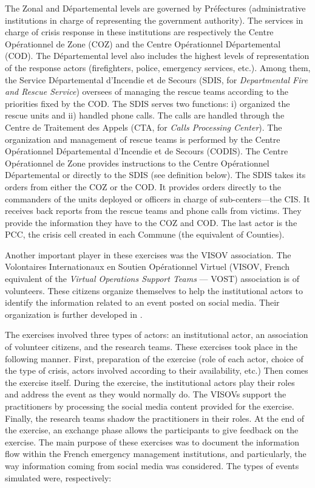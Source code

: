 The Zonal and Départemental levels are governed by Préfectures (administrative institutions in charge of representing the government authority).
The services in charge of crisis response in these institutions are respectively the Centre Opérationnel de Zone (COZ) and the Centre Opérationnel Départemental (COD).
The Départemental level also includes the highest levels of representation of the response actors (firefighters, police, emergency services, etc.).
Among them, the Service Départemental d'Incendie et de Secours (SDIS, for \textit{Departmental Fire and Rescue Service}) oversees of managing the rescue teams according to the priorities fixed by the COD.
The SDIS serves two functions: i) organized the rescue units and ii) handled phone calls.
The calls are handled through the Centre de Traitement des Appels (CTA, for \textit{Calls Processing Center}).
The organization and management of rescue teams is performed by the Centre Opérationnel Départemental d’Incendie et de Secours (CODIS).
The Centre Opérationnel de Zone provides instructions to the Centre Opérationnel Départemental or directly to the SDIS (see definition below).
The SDIS takes its orders from either the COZ or the COD.
It provides orders directly to the commanders of the units deployed or officers in charge of sub-centers—the CIS.
It receives back reports from the rescue teams and phone calls from victims.
They provide the information they have to the COZ and COD.
The last actor is the PCC, the crisis cell created in each Commune (the equivalent of Counties).

Another important player in these exercises was the VISOV association.
The Volontaires Internationaux en Soutien Opérationnel Virtuel (VISOV, French equivalent of the \textit{Virtual Operations Support Teams} — VOST) association is of volunteers.
These citizens organize themselves to help the institutional actors to identify the information related to an event posted on social media.
Their organization is further developed in \textcite[p.122--148]{batardIntegrerContributionsCitoyennes2021}.

The exercises involved three types of actors: an institutional actor, an association of volunteer citizens, and the research teams.
These exercises took place in the following manner.
First, preparation of the exercise (role of each actor, choice of the type of crisis, actors involved according to their availability, etc.)
Then comes the exercise itself.
During the exercise, the institutional actors play their roles and address the event as they would normally do.
The VISOVs support the practitioners by processing the social media content provided for the exercise.
Finally, the research teams shadow the practitioners in their roles.
At the end of the exercise, an exchange phase allows the participants to give feedback on the exercise.
The main purpose of these exercises was to document the information flow within the French emergency management institutions, and particularly, the way information coming from social media was considered.
The types of events simulated were, respectively:

